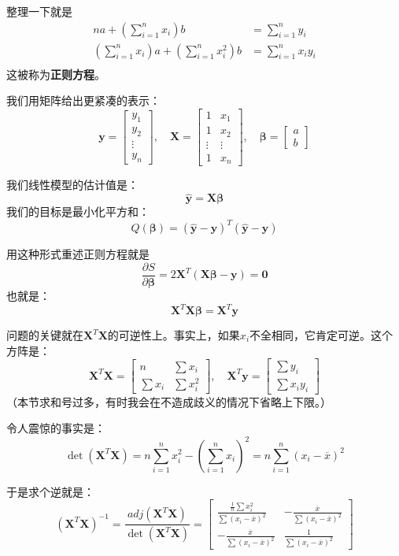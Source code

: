 整理一下就是
\begin{align*}
na+\left(\sum_{i=1}^nx_i\right)b &= \sum_{i=1}^ny_i\\
\left(\sum_{i=1}^nx_i\right)a+\left(\sum_{i=1}^nx_i^2\right)b &= \sum_{i=1}^nx_iy_i\\
\end{align*}
这被称为\textbf{正则方程}。

我们用矩阵给出更紧凑的表示：
\[
\mathbf{y} = 
\begin{bmatrix}
y_1 \\ y_2 \\ \vdots \\ y_n
\end{bmatrix},
\quad
\mathbf{X} = 
\begin{bmatrix}
1 & x_1 \\
1 & x_2\\
\vdots & \vdots \\
1 & x_n
\end{bmatrix},
\quad
\boldsymbol{\beta} = 
\begin{bmatrix}
a \\ b
\end{bmatrix}
\]

我们线性模型的估计值是：
\[
\hat{\mathbf{y}} =\mathbf{X} \boldsymbol{\beta}
\]
我们的目标是最小化平方和：
\[
Q(\boldsymbol{\beta}) = (\hat{\mathbf{y}}-\mathbf{y})^T (\hat{\mathbf{y}}-\mathbf{y})
\]

用这种形式重述正则方程就是
\[
\frac{\partial S}{\partial \boldsymbol{\beta}} = 2\mathbf{X}^T (\mathbf{X}\boldsymbol{\beta} -\mathbf{y}) = \mathbf{0}
\]
也就是：
\[
\mathbf{X}^T \mathbf{X} \boldsymbol{\beta} = \mathbf{X}^T \mathbf{y}
\]

问题的关键就在$\mathbf{X}^T \mathbf{X}$的可逆性上。事实上，如果$x_i$不全相同，它肯定可逆。这个方阵是：
\[
\mathbf{X}^T \mathbf{X} = 
\begin{bmatrix}
n & \sum x_i \\
\sum x_i & \sum x_i^2 
\end{bmatrix},
\quad
\mathbf{X}^T \mathbf{y} = 
\begin{bmatrix}
\sum y_i\\
\sum x_i y_i
\end{bmatrix}
\]
（本节求和号过多，有时我会在不造成歧义的情况下省略上下限。）

令人震惊的事实是：
\[
\det (\mathbf{X}^T \mathbf{X}) = n\sum_{i=1}^n x_i^2 -\left(\sum_{i=1}^n x_i \right)^2 = n\sum_{i=1}^n (x_i-\overline{x})^2
\]

于是求个逆就是：
\[
(\mathbf{X}^T \mathbf{X})^{-1} = \frac{adj(\mathbf{X}^T \mathbf{X})}{\det(\mathbf{X}^T \mathbf{X})}
= 
\begin{bmatrix}
\frac{\frac{1}{n}\sum x_i^2}{\sum (x_i-\overline{x})^2} & -\frac{\overline{x}}{\sum (x_i-\overline{x})^2} \\
-\frac{\overline{x}}{\sum (x_i-\overline{x})^2} & \frac{1}{\sum (x_i-\overline{x})^2}
\end{bmatrix}
\]

